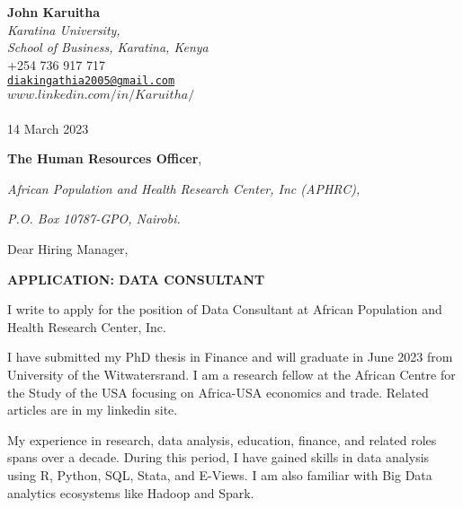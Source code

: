 \documentclass[
  12pt,
]{article}
\author{John Karuitha}
\date{14 March 2023}
\date{}
\begin{document}
\hfill
\begin{minipage}[t]{1\textwidth}
\raggedleft%
{\bfseries John Karuitha }\\[.35ex]
\emph{\small Karatina University,\\
School of Business, Karatina, Kenya} \\[.35ex]
\faPhone \hspace{1 mm} \small{+254 736 917 717} \\ 
\faEnvelopeO \hspace{1 mm} \small{\tt \href{mailto:diakingathia2005@gmail.com}{\nolinkurl{diakingathia2005@gmail.com}}} \\ 
\faGlobe \hspace{1 mm} \small{\href{http://\(www.linkedin.com/in/Karuitha/\)}{\tt \(www.linkedin.com/in/Karuitha/\)}}\\ 
\hspace{1cm} \\
 14 March 2023 \\ 
\end{minipage}


 

% 
% 

% 
\textbf{The Human Resources Officer},

\emph{African Population and Health Research Center, Inc (APHRC),}

\emph{P.O. Box 10787-GPO, Nairobi.}

Dear Hiring Manager,

\textbf{APPLICATION: DATA CONSULTANT}

I write to apply for the position of Data Consultant at African
Population and Health Research Center, Inc.

I have submitted my PhD thesis in Finance and will graduate in June 2023
from University of the Witwatersrand. I am a research fellow at the
African Centre for the Study of the USA focusing on Africa-USA economics
and trade. Related articles are in my linkedin site.

My experience in research, data analysis, education, finance, and
related roles spans over a decade. During this period, I have gained
skills in data analysis using R, Python, SQL, Stata, and E-Views. I am
also familiar with Big Data analytics ecosystems like Hadoop and Spark.
\end{document}
